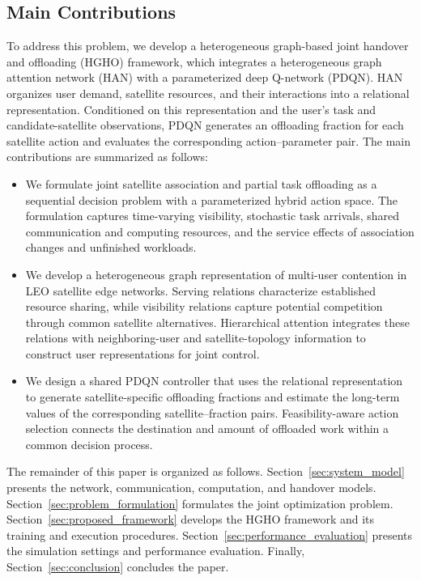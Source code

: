\documentclass[journal]{IEEEtran}
\begin{document}
\subsection{Main Contributions}

To address this problem, we develop a heterogeneous graph-based
joint handover and offloading (HGHO) framework, which integrates
a heterogeneous graph attention network (HAN) with a parameterized deep Q-network (PDQN).
HAN organizes user demand, satellite resources, and
their interactions into a relational representation.
Conditioned on this representation and the user's
task and candidate-satellite observations, PDQN generates
an offloading fraction for each satellite action and
evaluates the corresponding action--parameter pair.
The main contributions are summarized as follows:

\begin{itemize}
    \item We formulate joint satellite association and
    partial task offloading as a sequential decision
    problem with a parameterized hybrid action space.
    The formulation captures time-varying visibility,
    stochastic task arrivals, shared communication and
    computing resources, and the service effects of
    association changes and unfinished workloads.

    \item We develop a heterogeneous graph representation
    of multi-user contention in LEO satellite edge
    networks.
    Serving relations characterize established resource
    sharing, while visibility relations capture potential
    competition through common satellite alternatives.
    Hierarchical attention integrates these relations
    with neighboring-user and satellite-topology
    information to construct user representations
    for joint control.

    \item We design a shared PDQN controller that uses
    the relational representation to generate
    satellite-specific offloading fractions and
    estimate the long-term values of the corresponding
    satellite--fraction pairs.
    Feasibility-aware action selection connects the
    destination and amount of offloaded work within
    a common decision process.
\end{itemize}

The remainder of this paper is organized as follows.
Section~\ref{sec:system_model} presents the network,
communication, computation, and handover models.
Section~\ref{sec:problem_formulation} formulates the
joint optimization problem.
Section~\ref{sec:proposed_framework} develops the
HGHO framework and its training and execution
procedures.
Section~\ref{sec:performance_evaluation} presents
the simulation settings and performance evaluation.
Finally, Section~\ref{sec:conclusion} concludes the paper.
\end{document}
